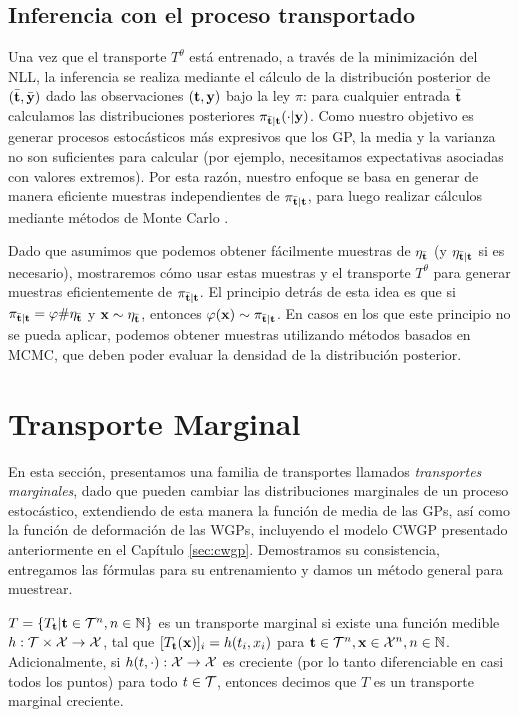 \subsection{Inferencia con el proceso transportado}

Una vez que el transporte \(T^\theta\) está entrenado, a través de la minimización del NLL, la inferencia se realiza mediante el cálculo de la distribución posterior de \((\bar{\mathbf{t}}, \bar{\mathbf{y}})\) dado las observaciones \((\mathbf{t}, \mathbf{y})\) bajo la ley \(\pi\): para cualquier entrada \(\bar{\mathbf{t}}\) calculamos las distribuciones posteriores \(\pi_{\bar{\mathbf{t}}|\mathbf{t}}(\cdot|\mathbf{y})\). Como nuestro objetivo es generar procesos estocásticos más expresivos que los GP, la media y la varianza no son suficientes para calcular (por ejemplo, necesitamos expectativas asociadas con valores extremos). Por esta razón, nuestro enfoque se basa en generar de manera eficiente muestras independientes de \(\pi_{\bar{\mathbf{t}}|\mathbf{t}}\), para luego realizar cálculos mediante métodos de Monte Carlo \cite{rubinstein2016simulation}.

Dado que asumimos que podemos obtener fácilmente muestras de \(\eta_{\bar{\mathbf{t}}}\) (y \(\eta_{\bar{\mathbf{t}}|\mathbf{t}}\) si es necesario), mostraremos cómo usar estas muestras y el transporte \(T^\theta\) para generar muestras eficientemente de \(\pi_{\bar{\mathbf{t}}|\mathbf{t}}\). El principio detrás de esta idea es que si \(\pi_{\bar{\mathbf{t}}|\mathbf{t}} = \varphi\#\eta_{\bar{\mathbf{t}}}\) y \(\mathbf{x} \sim \eta_{\bar{\mathbf{t}}}\), entonces \(\varphi(\mathbf{x}) \sim \pi_{\bar{\mathbf{t}}|\mathbf{t}}\). En casos en los que este principio no se pueda aplicar, podemos obtener muestras utilizando métodos basados en MCMC, que deben poder evaluar la densidad de la distribución posterior.


\section{Transporte Marginal}
\label{sec:marginaltransport}

En esta sección, presentamos una familia de transportes llamados \emph{transportes marginales}, dado que pueden cambiar las distribuciones marginales de un proceso estocástico, extendiendo de esta manera la función de media de las GPs, así como la función de deformación de las WGPs, incluyendo el modelo CWGP presentado anteriormente en el Capítulo \ref{sec:cwgp}. Demostramos su consistencia, entregamos las fórmulas para su entrenamiento y damos un método general para muestrear.

\begin{definition}
	\(T=\{T_{\mathbf{t}} | \mathbf{t} \in \mathcal{T}^n, n \in \mathbb{N}\}\) es un transporte marginal si existe una función medible \(h: \mathcal{T} \times \mathcal{X} \rightarrow \mathcal{X}\), tal que \([T_{\mathbf{t}}(\mathbf{x})]_i = h(t_i, x_i)\) para \(\mathbf{t} \in \mathcal{T}^n, \mathbf{x} \in \mathcal{X}^n, n \in \mathbb{N}\). Adicionalmente, si \(h(t,\cdot):\mathcal{X} \rightarrow \mathcal{X}\) es creciente (por lo tanto diferenciable en casi todos los puntos) para todo \(t \in \mathcal{T}\), entonces decimos que \(T\) es un transporte marginal creciente.
\end{definition}

